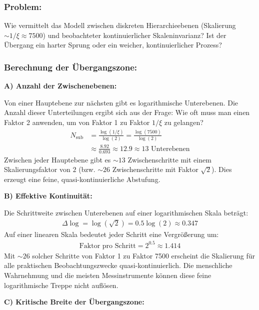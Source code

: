 \subsubsection*{Problem:}
Wie vermittelt das Modell zwischen diskreten Hierarchieebenen (Skalierung $\sim 1/\xi \approx 7500$) und beobachteter kontinuierlicher Skaleninvarianz? Ist der Übergang ein harter Sprung oder ein weicher, kontinuierlicher Prozess?

\subsubsection*{Berechnung der Übergangszone:}

\textbf{A) Anzahl der Zwischenebenen:}

Von einer Hauptebene zur nächsten gibt es logarithmische Unterebenen. Die Anzahl dieser Unterteilungen ergibt sich aus der Frage: Wie oft muss man einen Faktor 2 anwenden, um von Faktor 1 zu Faktor $1/\xi$ zu gelangen?
\begin{align*}
	N_{\text{sub}} &= \frac{\log(1/\xi)}{\log(2)} = \frac{\log(7500)}{\log(2)} \\
	&\approx \frac{8.92}{0.693} \approx 12.9 \approx 13 \text{ Unterebenen}
\end{align*}
Zwischen jeder Hauptebene gibt es $\sim 13$ Zwischenschritte mit einem Skalierungsfaktor von $2$ (bzw. $\sim 26$ Zwischenschritte mit Faktor $\sqrt{2}$). Dies erzeugt eine feine, quasi-kontinuierliche Abstufung.

\textbf{B) Effektive Kontinuität:}

Die Schrittweite zwischen Unterebenen auf einer logarithmischen Skala beträgt:
\begin{align*}
	\Delta \log = \log(\sqrt{2}) = 0.5 \log(2) \approx 0.347
\end{align*}
Auf einer linearen Skala bedeutet jeder Schritt eine Vergrößerung um:
\begin{align*}
	\text{Faktor pro Schritt} = 2^{0.5} \approx 1.414
\end{align*}
Mit $\sim 26$ solcher Schritte von Faktor 1 zu Faktor 7500 erscheint die Skalierung für alle praktischen Beobachtungszwecke quasi-kontinuierlich. Die menschliche Wahrnehmung und die meisten Messinstrumente können diese feine logarithmische Treppe nicht auflösen.

\textbf{C) Kritische Breite der Übergangszone:}

